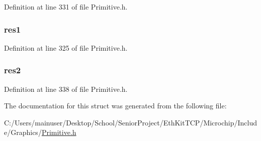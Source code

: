 Definition at line 331 of file Primitive.\+h.

\hypertarget{struct_f_o_n_t___h_e_a_d_e_r_a44aabc97449e6441f078daab76739f6f}{}
\subsubsection[{res1}]{ res1}\label{struct_f_o_n_t___h_e_a_d_e_r_a44aabc97449e6441f078daab76739f6f}


Definition at line 325 of file Primitive.\+h.

\hypertarget{struct_f_o_n_t___h_e_a_d_e_r_acb6ef262e7e4611ddc08e67fadbbaace}{}
\subsubsection[{res2}]{ res2}\label{struct_f_o_n_t___h_e_a_d_e_r_acb6ef262e7e4611ddc08e67fadbbaace}


Definition at line 338 of file Primitive.\+h.



The documentation for this struct was generated from the following file\+:\begin{DoxyCompactItemize}
\item 
C\+:/\+Users/mainuser/\+Desktop/\+School/\+Senior\+Project/\+Eth\+Kit\+T\+C\+P/\+Microchip/\+Include/\+Graphics/\hyperlink{_primitive_8h}{Primitive.\+h}\end{DoxyCompactItemize}
